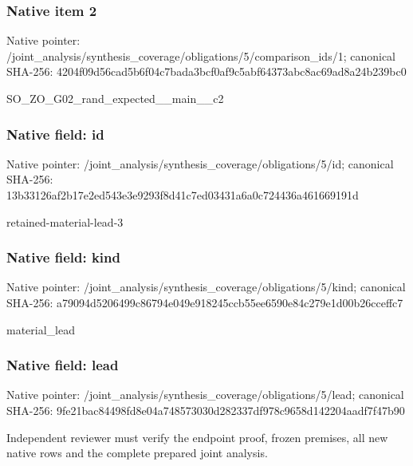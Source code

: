 \documentclass[10pt,a4paper]{article}
\begin{document}
\subsubsection{Native item 2}
Native pointer: /joint\_\allowbreak{}analysis/synthesis\_\allowbreak{}coverage/obligations/5/comparison\_\allowbreak{}ids/1; canonical SHA-256: 4204f09d56cad5b6f04c7bada3bcf0af9c5abf64373abc8ac69ad8a24b239bc0

\begingroup\raggedright\sloppy SO\_\allowbreak{}ZO\_\allowbreak{}G02\_\allowbreak{}rand\_\allowbreak{}expected\_\allowbreak{}\_\allowbreak{}main\_\allowbreak{}\_\allowbreak{}c2\par\endgroup

\subsubsection{Native field: id}
Native pointer: /joint\_\allowbreak{}analysis/synthesis\_\allowbreak{}coverage/obligations/5/id; canonical SHA-256: 13b33126af2b17e2ed543e3e9293f8d41c7ed03431a6a0c724436a461669191d

\begingroup\raggedright\sloppy retained-material-lead-3\par\endgroup

\subsubsection{Native field: kind}
Native pointer: /joint\_\allowbreak{}analysis/synthesis\_\allowbreak{}coverage/obligations/5/kind; canonical SHA-256: a79094d5206499c86794e049e918245ccb55ee6590e84c279e1d00b26cceffc7

\begingroup\raggedright\sloppy material\_\allowbreak{}lead\par\endgroup

\subsubsection{Native field: lead}
Native pointer: /joint\_\allowbreak{}analysis/synthesis\_\allowbreak{}coverage/obligations/5/lead; canonical SHA-256: 9fe21bac84498fd8e04a748573030d282337df978c9658d142204aadf7f47b90

\begingroup\raggedright\sloppy Independent reviewer must verify the endpoint proof,\allowbreak{} frozen premises,\allowbreak{} all new native rows and the complete prepared joint analysis.\par\endgroup
\end{document}
